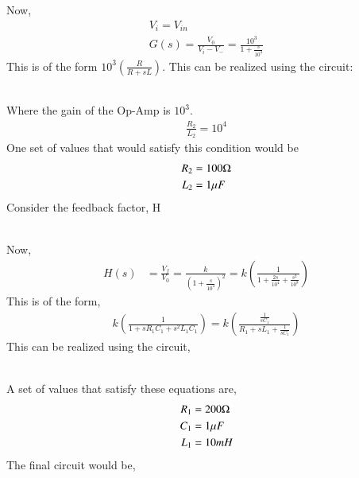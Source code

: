 \begin{enumerate}[label=\thesection.\arabic*.,ref=\thesection.\theenumi]
Now, 
\begin{align}
V_i=V_{in}\\
G(s)=\frac{V_0}{V_i-V_-}= \frac{10^3}{1+\frac{s}{10^4}}
\end{align}
This is of the form $10^3 \left(\frac{R}{R+sL}\right)$.
This can be realized using the circuit:
\begin{figure}[!ht]
	\begin{center}
		\resizebox{\columnwidth}{!}{}
	\end{center}
\caption{}
\label{fig:ee18btech11006_3}
\end{figure} \\
Where the gain of the Op-Amp is $10^3$.
\begin{align}
    \frac{R_2}{L_2}=10^4
\end{align}
One set of values that would satisfy this condition would be 
\begin{align}
    R_2&= 100\ohm \\
    L_2&=1 \mu F
\end{align}
Consider the feedback factor, H \newline
\begin{figure}[!ht]
	\begin{center}
		\resizebox{\columnwidth}{!}{}
	\end{center}
\caption{}
\label{fig:ee18btech11006_5}
\end{figure} \\
Now, 
\begin{align}
H(s)&=\frac{V_f}{V_0}= \frac{k}{\left(1+\frac{s}{10^4}\right)^2} = k\left({\frac{1}{1+\frac{2s}{10^4}+\frac{s^2}{10^8}}}\right)  
\end{align}
This is of the form,
\begin{align}
k\left(\frac{1}{1+s{R_1}{C_1}+{s^2}{L_1}{C_1}}\right) =  k\left(\frac{\frac{1}{s{C_1}}}{{R_1}+s{L_1}+\frac{1}{s{C_1}}}\right)  
\end{align}
This can be realized using the circuit,
\begin{figure}[!ht]
	\begin{center}
		\resizebox{\columnwidth}{!}{}
	\end{center}
\caption{}
\label{fig:ee18btech11006_2}
\end{figure} \\
A set of values that satisfy these equations are,
\begin{align}
R_1&= 200\ohm \\
C_1&= 1\mu F\\
L_1&= 10mH 
\end{align}
The final circuit would be,
\begin{figure}[!ht]
	\begin{center}
		\resizebox{2\columnwidth}{!}{}
	\end{center}
\caption{}
\label{fig:ee18btech11006_6}
\end{figure}
\end{enumerate}
